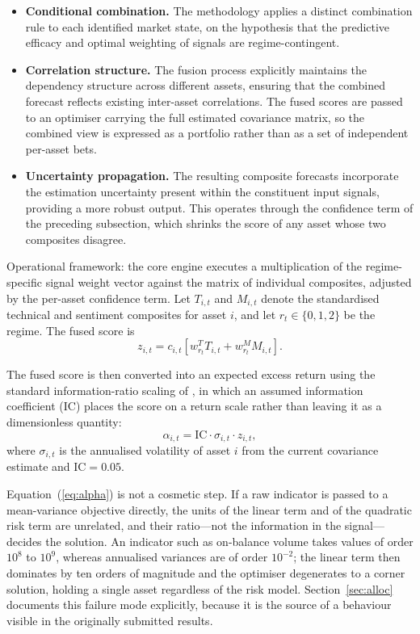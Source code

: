 \documentclass{singlecol-new}
\theoremstyle{TH}{
\newtheorem{lemma}{Lemma}
\newtheorem{theorem}[lemma]{Theorem}
\newtheorem{corrolary}[lemma]{Corrolary}
\newtheorem{conjecture}[lemma]{Conjecture}
\newtheorem{proposition}[lemma]{Proposition}
\newtheorem{claim}[lemma]{Claim}
\newtheorem{stheorem}[lemma]{Wrong Theorem}
\newtheorem{algorithm}{Algorithm}
}
\theoremstyle{THrm}{
\newtheorem{definition}{Definition}[section]
\newtheorem{question}{Question}[section]
\newtheorem{remark}{Remark}
\newtheorem{scheme}{Scheme}
}
\theoremstyle{THhit}{
\newtheorem{case}{Case}[section]
}
\begin{document}
\begin{itemize}
\item \textbf{Conditional combination.} The methodology applies a distinct combination
rule to each identified market state, on the hypothesis that the predictive efficacy and
optimal weighting of signals are regime-contingent.
\item \textbf{Correlation structure.} The fusion process explicitly maintains the
dependency structure across different assets, ensuring that the combined forecast reflects
existing inter-asset correlations. The fused scores are passed to an optimiser carrying
the full estimated covariance matrix, so the combined view is expressed as a portfolio
rather than as a set of independent per-asset bets.
\item \textbf{Uncertainty propagation.} The resulting composite forecasts incorporate the
estimation uncertainty present within the constituent input signals, providing a more
robust output. This operates through the confidence term of the preceding subsection,
which shrinks the score of any asset whose two composites disagree.
\end{itemize}

Operational framework: the core engine executes a multiplication of the regime-specific
signal weight vector against the matrix of individual composites, adjusted by the
per-asset confidence term. Let $T_{i,t}$ and $M_{i,t}$ denote the standardised technical
and sentiment composites for asset $i$, and let $r_t \in \{0,1,2\}$ be the regime. The
fused score is
\begin{equation}
z_{i,t} = c_{i,t} \left[ w^{T}_{r_t} T_{i,t} + w^{M}_{r_t} M_{i,t} \right].
\end{equation}

The fused score is then converted into an expected excess return using the standard
information-ratio scaling of \citet{grinold00}, in which an assumed information
coefficient (IC) places the score on a return scale rather than leaving it as a
dimensionless quantity:
\begin{equation}
\alpha_{i,t} = \mathrm{IC} \cdot \sigma_{i,t} \cdot z_{i,t},
\label{eq:alpha}
\end{equation}
where $\sigma_{i,t}$ is the annualised volatility of asset $i$ from the current
covariance estimate and $\mathrm{IC} = 0.05$.

Equation~(\ref{eq:alpha}) is not a cosmetic step. If a raw indicator is passed to a
mean-variance objective directly, the units of the linear term and of the quadratic risk
term are unrelated, and their ratio---not the information in the signal---decides the
solution. An indicator such as on-balance volume takes values of order $10^{8}$ to
$10^{9}$, whereas annualised variances are of order $10^{-2}$; the linear term then
dominates by ten orders of magnitude and the optimiser degenerates to a corner solution,
holding a single asset regardless of the risk model. Section~\ref{sec:alloc} documents
this failure mode explicitly, because it is the source of a behaviour visible in the
originally submitted results.
\end{document}
